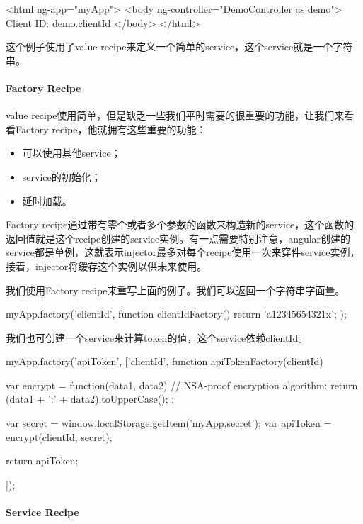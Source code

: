 \begin{HTML}
<html ng-app="myApp">
	<body ng-controller="DemoController as demo">
	Client ID: {{demo.clientId}}
	</body>
</html>
\end{HTML}

这个例子使用了value recipe来定义一个简单的service，这个service就是一个字符串。


\paragraph{Factory Recipe}

value recipe使用简单，但是缺乏一些我们平时需要的很重要的功能，让我们来看看Factory recipe，他就拥有这些重要的功能：

\begin{itemize}
	\item 可以使用其他service；
	\item service的初始化；
	\item 延时加载。
\end{itemize}


Factory recipe通过带有零个或者多个参数的函数来构造新的service，这个函数的返回值就是这个recipe创建的service实例。有一点需要特别注意，angular创建的service都是单例，这就表示injector最多对每个recipe使用一次来穿件service实例，接着，injector将缓存这个实例以供未来使用。

我们使用Factory recipe来重写上面的例子。我们可以返回一个字符串字面量。

\begin{JavaScript}
myApp.factory('clientId', function clientIdFactory() {
  return 'a12345654321x';
});
\end{JavaScript}

我们也可创建一个service来计算token的值，这个service依赖clientId。
\begin{JavaScript}
myApp.factory('apiToken', ['clientId', function apiTokenFactory(clientId) {
  var encrypt = function(data1, data2) {
    // NSA-proof encryption algorithm:
    return (data1 + ':' + data2).toUpperCase();
  };

  var secret = window.localStorage.getItem('myApp.secret');
  var apiToken = encrypt(clientId, secret);

  return apiToken;
}]);
\end{JavaScript}


\paragraph{Service Recipe}

